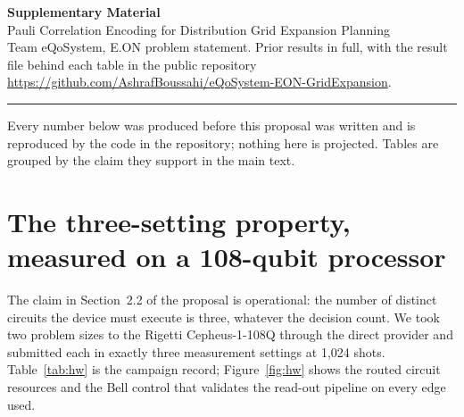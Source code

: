 \documentclass[10pt,a4paper]{article}
\newcommand{\repourl}{https://github.com/AshrafBoussahi/eQoSystem-EON-GridExpansion}
\begin{document}
\begin{center}
{\color{eon}\bfseries\Large Supplementary Material}\\[3pt]
{\large Pauli Correlation Encoding for Distribution Grid Expansion Planning}\\[4pt]
Team eQoSystem, E.ON problem statement. Prior results in full, with the result
file behind each table in the public repository \url{\repourl}.
\end{center}
\vspace{2pt}\hrule\vspace{4pt}

Every number below was produced before this proposal was written and is
reproduced by the code in the repository; nothing here is projected. Tables
are grouped by the claim they support in the main text.

\section{The three-setting property, measured on a 108-qubit processor}

The claim in Section~2.2 of the proposal is operational: the number of
distinct circuits the device must execute is three, whatever the decision
count. We took two problem sizes to the Rigetti Cepheus-1-108Q through the
direct provider and submitted each in exactly three measurement settings at
1,024 shots. Table~\ref{tab:hw} is the campaign record; Figure~\ref{fig:hw}
shows the routed circuit resources and the Bell control that validates the
read-out pipeline on every edge used.
\end{document}
